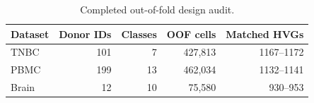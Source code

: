 \begin{table}[H]
\centering
\caption{Completed out-of-fold design audit.}
\label{tab:design-audit}
\small
\begin{tabular}{lrrrr}
\toprule
Dataset & Donor IDs & Classes & OOF cells & Matched HVGs \\
\midrule
TNBC & 101 & 7 & 427,813 & 1167--1172 \\
PBMC & 199 & 13 & 462,034 & 1132--1141 \\
Brain & 12 & 10 & 75,580 & 930--953 \\
\bottomrule
\end{tabular}
\end{table}
